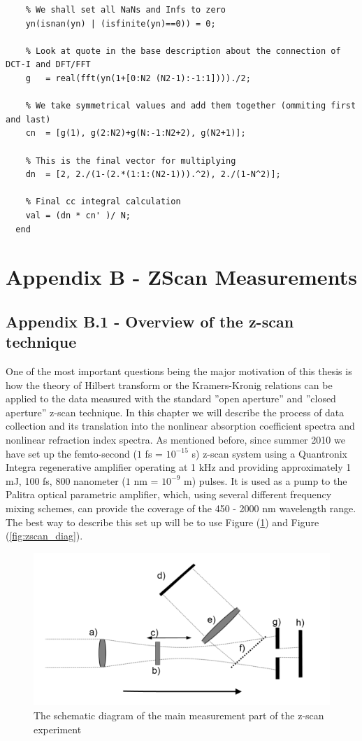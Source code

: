 \documentclass[12pt,twoside,a4paper]{article}
\numberwithin{equation}{subsection}
\numberwithin{figure}{subsection}
\begin{document}
\begin{lstlisting}
    % We shall set all NaNs and Infs to zero
    yn(isnan(yn) | (isfinite(yn)==0)) = 0;               

    % Look at quote in the base description about the connection of DCT-I and DFT/FFT
    g   = real(fft(yn(1+[0:N2 (N2-1):-1:1])))./2;        

    % We take symmetrical values and add them together (ommiting first and last)
    cn  = [g(1), g(2:N2)+g(N:-1:N2+2), g(N2+1)];         

    % This is the final vector for multiplying
    dn  = [2, 2./(1-(2.*(1:1:(N2-1))).^2), 2./(1-N^2)];  

    % Final cc integral calculation
    val = (dn * cn' )/ N;                                
  end
\end{lstlisting}

\section*{Appendix B - ZScan Measurements} \label{chap:zscan}
\subsection*{Appendix B.1 - Overview of the z-scan technique} \label{chap:zscan_overview}

One of the most important questions being the major motivation of this thesis is how the theory of Hilbert transform or the Kramers-Kronig relations can be applied to the data measured with the standard ''open aperture'' and ''closed aperture'' z-scan technique. In this chapter we will describe the process of data collection and its translation into the nonlinear absorption coefficient spectra and nonlinear refraction index spectra. As mentioned before, since summer 2010 we have set up the femto-second ($1$ fs = $10^{-15}$ s) z-scan system using a Quantronix Integra regenerative amplifier operating at 1 kHz and providing approximately 1 mJ, 100 fs, 800 nanometer ($1$ nm = $10^{-9}$ m) pulses. It is used as a pump to the Palitra optical parametric amplifier, which, using several different frequency mixing schemes, can provide the coverage of the 450 - 2000 nm wavelength range. The best way to describe this set up will be to use Figure (\ref{fig:zscan_sch}) and Figure (\ref{fig:zscan_diag}).

\begin{figure}
 \includegraphics{img/zscan_sch.png}
 \caption{ The schematic diagram of the main measurement part of the z-scan experiment 
 \label{fig:zscan_sch}}
\end{figure}
\end{document}
